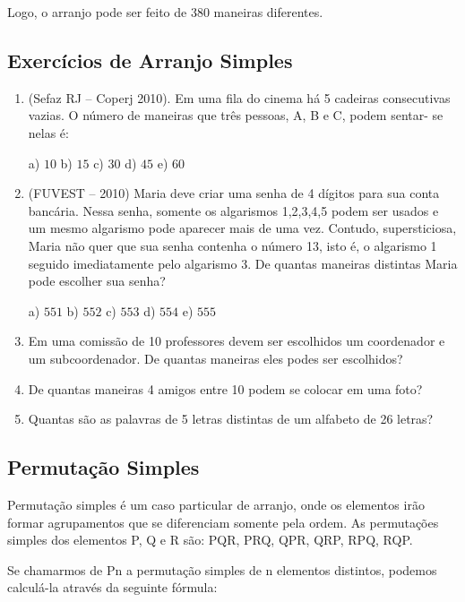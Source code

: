 \begin{multicols*}{2}
	Logo, o arranjo pode ser feito de 380 maneiras diferentes.

	\subsection*{Exercícios de Arranjo Simples}

	\begin{enumerate}[wide, labelwidth=!, labelindent=0pt]

		\item (Sefaz RJ  --  Coperj 2010). Em uma fila do cinema há 5 cadeiras consecutivas
		      vazias. O número de maneiras que três pessoas, A, B e C, podem sentar- se nelas é:

		      a) $10 $ b) $15 $ c) $30 $ d) $45 $ e) $60 $

		\item (FUVEST -- 2010) Maria deve criar uma senha de 4 dígitos para sua conta bancária.
		      Nessa senha, somente os algarismos 1,2,3,4,5 podem ser usados e um mesmo algarismo pode
		      aparecer mais de uma vez. Contudo, supersticiosa, Maria não quer que sua senha contenha o
		      número 13, isto é, o algarismo 1 seguido imediatamente pelo algarismo 3. De quantas maneiras
		      distintas Maria pode escolher sua senha?

		      a) $551 $ b) $552 $ c) $553 $ d) $554 $ e) $555 $

		\item Em uma comissão de 10 professores devem ser escolhidos um coordenador e um subcoordenador. De quantas maneiras eles podes ser escolhidos?

		\item De quantas maneiras 4 amigos entre 10 podem se colocar em uma foto?

		\item Quantas são as palavras de 5 letras distintas de um alfabeto de 26 letras?

	\end{enumerate}

	\subsection*{Permutação Simples}

	Permutação simples é um caso particular de arranjo, onde os elementos irão formar agrupamentos que se diferenciam somente pela ordem. As permutações simples dos elementos P, Q e R são: PQR, PRQ, QPR, QRP, RPQ, RQP.

	Se chamarmos de Pn a permutação simples de n elementos distintos, podemos calculá-la através da seguinte fórmula:


\end{multicols*}
